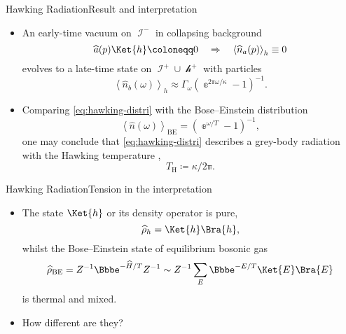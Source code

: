 \documentclass{beamer}
\newcommand{\ee}{{\Bbbe}}
\newcommand{\pp}{{\Bbbpi}}
\newcommand{\rbr}[1]{{\left(#1\right)}}
\newcommand{\abr}[1]{{\left<#1\right>}}
\newcommand{\rfun}[2]{{#1}\mathopen{}\left(#2\right)\mathclose{}}
\newcommand{\what}[1]{{\widehat{#1}}}
\begin{document}
\begin{frame}{Hawking Radiation}{Result and interpretation}

\begin{itemize}
\item An early-time \alert{vacuum} on $\mscrI^-$ in collapsing background
\begin{equation}
\rfun{\what{a}}{p}\Ket{h} \coloneqq 0\quad\Rightarrow\quad
\abr{\rfun{\what{n}_a}{p}}_h \equiv 0
\end{equation}
evolves to a late-time state on $\mscrI^+\cup\mscrh^+$ \alert{with particles}
\cite{HAWKING1974}
\begin{equation}
\abr{\rfun{\what{n}_b}{\omega}}_h \approx
\Gamma_\omega\rbr{\ee^{2\pp\omega/\kappa}-1}^{-1}.
\label{eq:hawking-distri}
\end{equation}
\item Comparing \cref{eq:hawking-distri} with the Bose--Einstein distribution
\begin{equation}
\abr{\rfun{\what{n}}{\omega}}_\text{BE} = \rbr{\ee^{\omega/T} - 1}^{-1}, 
\end{equation}
one may conclude that \cref{eq:hawking-distri} describes a grey-body
radiation with the \alert{Hawking temperature} \cite{Hawking1975},
\begin{equation}
T_\text{H} \coloneqq \kappa/2\pp.
\end{equation}

\end{itemize}

\end{frame}


\begin{frame}{Hawking Radiation}{Tension in the interpretation}
\begin{itemize}
\item The state $\Ket{h}$ or its density operator is \alert{pure},
\begin{equation}
\what{\rho}_h = \Ket{h}\Bra{h},
\end{equation}
whilst the Bose--Einstein state of equilibrium bosonic gas
\begin{equation}
\what{\rho}_\text{BE} = {Z}^{-1} \ee^{-\what{H}/T}
Z^{-1} \sim Z^{-1} \sum_E \ee^{-E/T} \Ket{E}\Bra{E}
\end{equation}
is \alert{thermal} and \alert{mixed}.
\item How different are they? \cite{Kiefer2001,Hsu2009}
\end{itemize}
\end{frame}
\end{document}
